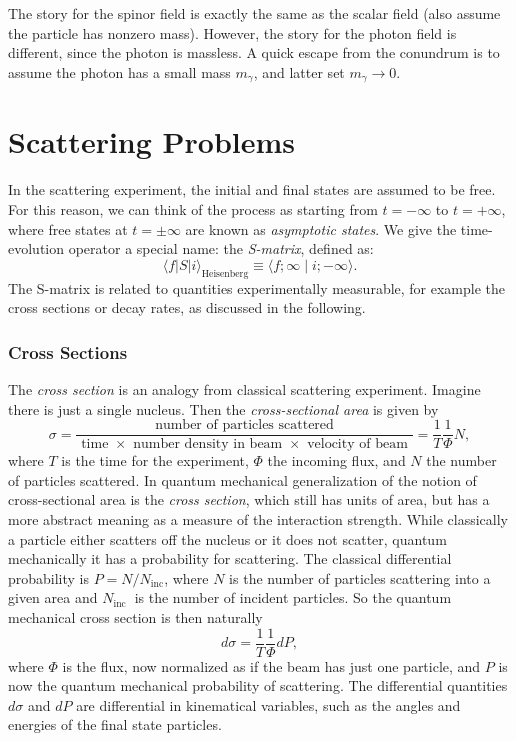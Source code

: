 \documentclass[aps,prb,superscriptaddress,nofootinbib]{revtex4}
\begin{document}
The story for the spinor field is exactly the same as the scalar field (also assume the particle has nonzero mass).
However, the story for the photon field is different, since the photon is massless.
A quick escape from the conundrum is to assume the photon has a small mass $m_\gamma$, and latter set $m_\gamma \rightarrow 0$.





\section{Scattering Problems}

In the scattering experiment, the initial and final states are assumed to be free.
For this reason, we can think of the process as starting from $t=-\infty$ to $t=+\infty$, where free states at $t=\pm \infty$ are known as \textit{asymptotic states}.
We give the time-evolution operator a special name: the \textit{S-matrix}, defined as:
\begin{equation}
	\langle f|S| i\rangle_{\text{Heisenberg}} \equiv \langle f ; \infty \mid i ;-\infty\rangle.
\end{equation}
The S-matrix is related to quantities experimentally measurable, for example the cross sections or decay rates, as discussed in the following.

\subsubsection{Cross Sections}
The \textit{cross section} is an analogy from classical scattering experiment.
Imagine there is just a single nucleus. 
Then the \textit{cross-sectional area} is given by
\begin{equation}
	\sigma=\frac{\text { number of particles scattered }}{\text { time } \times \text { number density in beam } \times \text { velocity of beam }}=\frac{1}{T} \frac{1}{\Phi} N,
\end{equation}
where $T$ is the time for the experiment, $\Phi$ the incoming flux, and $N$ the number of particles scattered.
In quantum mechanical generalization of the notion of cross-sectional area is the \textit{cross section}, which still has units of area, but has a more abstract meaning as a measure of the interaction strength. 
While classically a particle either scatters off the nucleus or it does not scatter, quantum mechanically it has a probability for scattering. 
The classical differential probability is $P=N/N_{\text{inc}}$, where $N$ is the number of particles scattering into a given area and $N_{\text {inc }}$ is the number of incident particles. 
So the quantum mechanical cross section is then naturally
\begin{equation}
	d \sigma=\frac{1}{T} \frac{1}{\Phi} d P,
\end{equation}
where $\Phi$ is the flux, now normalized as if the beam has just one particle, and $P$ is now the quantum mechanical probability of scattering. 
The differential quantities $d \sigma$ and $d P$ are differential in kinematical variables, such as the angles and energies of the final state particles.  
\end{document}
